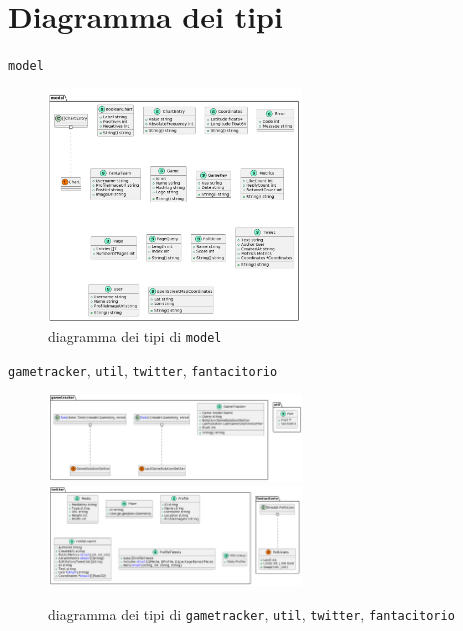 \documentclass{beamer}
\begin{document}
\section{Diagramma dei tipi}
\begin{frame}{\texttt{model}}
	\begin{figure}
		\includegraphics[width=0.6\textwidth]{backend-model}
		\caption{diagramma dei tipi di \texttt{model}}
	\end{figure}
\end{frame}

\begin{frame}{\texttt{gametracker}, \texttt{util}, \texttt{twitter},
		\texttt{fantacitorio}}
	\begin{figure}
		\includegraphics[width=0.6\textwidth]{backend-gametracker-util}
		\includegraphics[width=0.6\textwidth]{backend-twitter-fantacitorio}
		\caption{diagramma dei tipi di \texttt{gametracker}, \texttt{util},
			\texttt{twitter}, \texttt{fantacitorio}}
	\end{figure}
\end{frame}
\end{document}
